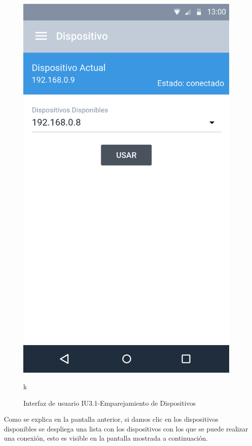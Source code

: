 \begin{figure}[H]
	\centering
	\includegraphics[scale=0.70]{Capitulo4/software/submodulos/images/dispositivos.png}
	\caption{Interfaz de usuario IU3.1-Emparejamiento de Dispositivos}
k	\label{fig:Emparejamiento Dispositivo}
\end{figure}

Como se explica en la pantalla anterior, si damos clic en los dispositivos disponibles se despliega una lista con los dispositivos con los que se puede realizar una conexión, esto es visible en la pantalla mostrada a continuación.

